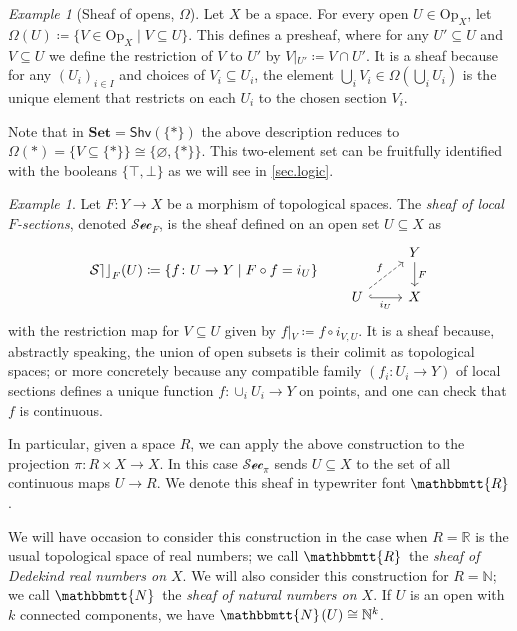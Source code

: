 \documentclass[11pt, oneside, article]{memoir}
\theoremstyle{plain}
\theoremstyle{definition}
\theoremstyle{remark}
\newtheorem{example}[theorem]{Example}
\renewcommand{\ss}{\subseteq}
\newcommand{\Set}[1]{\mathrm{#1}}
\newcommand{\Cat}[1]{\mathbf{#1}}
\newcommand{\fun}[1]{\mathcal{#1}}
\newcommand{\Fun}[1]{\mathsf{#1}}
\newcommand{\sheaf}[1]{\fun{#1}}
\newcommand{\smset}{\Cat{Set}}
\newcommand{\internal}[1]{\raisebox{-.03ex}{$\mathbbmtt{#1}$}}
\renewcommand{\sec}{\sheaf{Sec}}
\newcommand{\hs}{\hspace{1.1pt}}
\newcommand{\nn}{\mathbb{N}}
\newcommand{\rr}{\mathbb{R}}
\newcommand{\tnn}{\internal{N}\hs}
\newcommand{\trr}{\internal{R}\hs}
\newcommand{\shv}{\Fun{Shv}}
\newcommand{\Op}{\Set{Op}}
\newcommand{\rest}[2]{#1\big|\hspace{0in}_{#2}}
\newcommand{\true}{\top}
\newcommand{\false}{\bot}
\begin{document}
\begin{example}[Sheaf of opens, $\Omega$]\label{ex.subobject_classifier}
Let $X$ be a space. For every open $U\in\Op_X$, let $\Omega(U)\coloneqq\{V\in\Op_X\mid V\ss U\}$. This defines a presheaf, where for any $U'\ss U$ and $V\ss U$ we define the restriction of $V$ to $U'$ by $\rest{V}{U'}\coloneqq V\cap U'$. It is a sheaf because for any $(U_i)_{i\in I}$ and choices of $V_i\ss U_i$, the element $\bigcup_iV_i\in\Omega(\bigcup_i U_i)$ is the unique element that restricts on each $U_i$ to the chosen section $V_i$.

Note that in $\smset=\shv(\{*\})$ the above description reduces to $\Omega(*)=\{V\ss\{*\}\}\cong\{\varnothing,\{*\}\}$. This two-element set can be fruitfully identified with the booleans $\{\true,\false\}$ as we will see in \cref{sec.logic}.
\end{example}

\begin{example}\label{ex.sections}
Let $F\colon Y\to X$ be a morphism of topological spaces. The \emph{sheaf of local $F$-sections}, denoted $\sec_F$, is the sheaf defined on an open set $U\ss X$ as
\begin{equation}\label{eqn.sections}
\sec_F(U)\coloneqq\{f\colon U\to Y\mid F\circ f=i_U\}
\qquad
\begin{tikzcd}
	&Y\ar[d, "F"]\\
	U\ar[r, hook, "i_U"']\ar[ur, dashed, "f"]&
	X
\end{tikzcd}
\end{equation}
with the restriction map for $V\ss U$ given by $\rest{f}{V}\coloneqq f\circ i_{V,U}$. It is a sheaf because, abstractly speaking, the union of open subsets is their colimit as topological spaces; or more concretely because any compatible family $(f_i\colon U_i\to Y)$ of local sections defines a unique function $f\colon \cup_iU_i\to Y$ on points, and one can check that $f$ is continuous.

In particular, given a space $R$, we can apply the above construction to the projection $\pi\colon R\times X\to X$. In this case $\sec_\pi$ sends $U\ss X$ to the set of all continuous maps $U\to R$. We denote this sheaf in typewriter font $\internal{R}$.

We will have occasion to consider this construction in the case when $R=\rr$ is the usual topological space of real numbers; we call $\trr$ the \emph{sheaf of Dedekind real numbers on $X$}. We will also consider this construction for $R=\nn$; we call $\tnn$ the \emph{sheaf of natural numbers on $X$}. If $U$ is an open with $k$ connected components, we have $\tnn(U)\cong\nn^k$.
\end{example}
\end{document}
